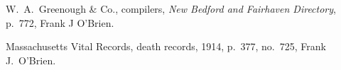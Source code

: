 \begin{thebibliography}{999}
W.\ A.\ Greenough \& Co., compilers, \textit{New Bedford and Fairhaven Directory}, p.\ 772, Frank J O'Brien.

Massachusetts Vital Records, death records, 1914, p.\ 377, no.\ 725, Frank J.\ O'Brien.
	
\end{thebibliography}